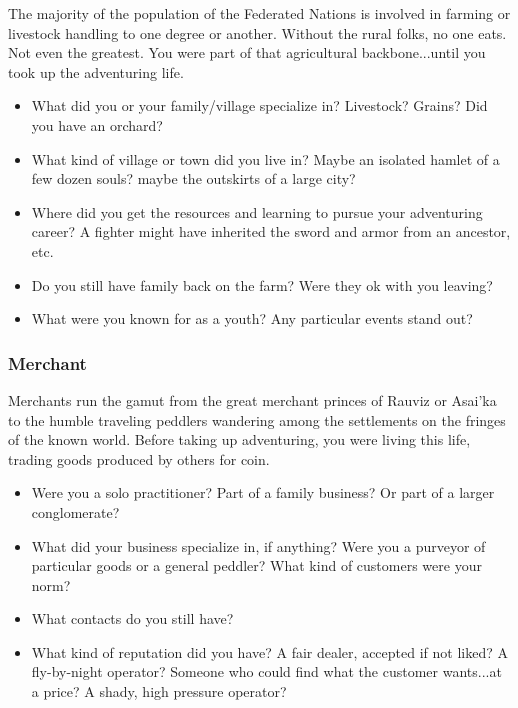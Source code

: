 The majority of the population of the Federated Nations is involved in farming or livestock handling to one degree or another. Without the rural folks, no one eats. Not even the greatest. You were part of that agricultural backbone...until you took up the adventuring life.

\begin{itemize}
	\item What did you or your family/village specialize in? Livestock? Grains? Did you have an orchard?
	\item What kind of village or town did you live in? Maybe an isolated hamlet of a few dozen souls? maybe the outskirts of a large city?
	\item Where did you get the resources and learning to pursue your adventuring career? A fighter might have inherited the sword and armor from an ancestor, etc.
	\item Do you still have family back on the farm? Were they ok with you leaving?
	\item What were you known for as a youth? Any particular events stand out?
\end{itemize}

\subsubsection{Merchant}

Merchants run the gamut from the great merchant princes of Rauviz or Asai'ka to the humble traveling peddlers wandering among the settlements on the fringes of the known world. Before taking up adventuring, you were living this life, trading goods produced by others for coin.

\begin{itemize}
	\item Were you a solo practitioner? Part of a family business? Or part of a larger conglomerate?
	\item What did your business specialize in, if anything? Were you a purveyor of particular goods or a general peddler? What kind of customers were your norm?
	\item What contacts do you still have?
	\item What kind of reputation did you have? A fair dealer, accepted if not liked? A fly-by-night operator? Someone who could find what the customer wants...at a price? A shady, high pressure operator?
\end{itemize}

